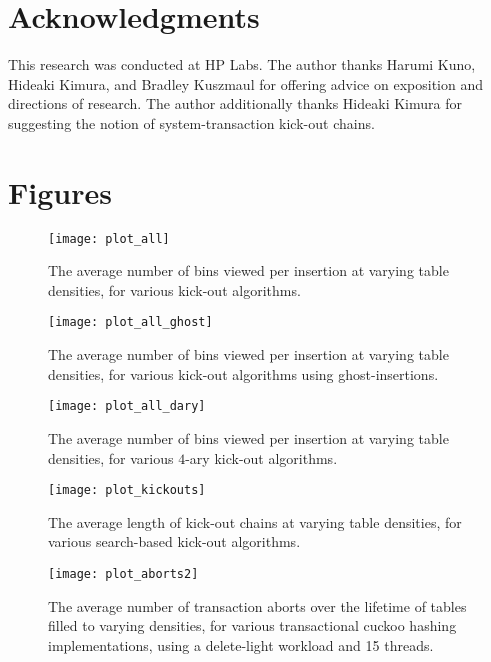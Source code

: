 \documentclass{sig-alternate-05-2015}
\begin{document}
\section{Acknowledgments}\label{secawk}

This research was conducted at HP Labs. The author thanks Harumi Kuno,
Hideaki Kimura, and Bradley Kuszmaul for offering advice on exposition
and directions of research. The author additionally thanks Hideaki
Kimura for suggesting the notion of system-transaction kick-out
chains.













\newpage

 
\clearpage
\clearpage


\section{Figures}

\begin{figure}[!htb]
  \texttt{[image: plot\_all]}
  \caption{The average number of bins viewed per insertion at varying
    table densities, for various kick-out algorithms.}
  \label{fig_A}
\end{figure}

\begin{figure}[!htb]
  \texttt{[image: plot\_all\_ghost]}
    \caption{The average number of bins viewed per insertion at
      varying table densities, for various kick-out algorithms using
      ghost-insertions.}
  \label{fig_B}
\end{figure}

\begin{figure}[!htb]
  \texttt{[image: plot\_all\_dary]}
      \caption{The average number of bins viewed per insertion at
        varying table densities, for various $4$-ary kick-out
        algorithms.}
  \label{fig_C}
\end{figure}


\begin{figure}[!htb]
  \texttt{[image: plot\_kickouts]}
  \caption{The average length of kick-out chains at varying table
    densities, for various search-based kick-out algorithms.}
  \label{fig_D}
\end{figure}

\begin{figure}[!htb]
  \texttt{[image: plot\_aborts2]}
  \caption{The average number of transaction aborts over the lifetime
    of tables filled to varying densities, for various transactional
    cuckoo hashing implementations, using a delete-light workload and
    15 threads.}
  \label{fig_E}
\end{figure}
\end{document}
